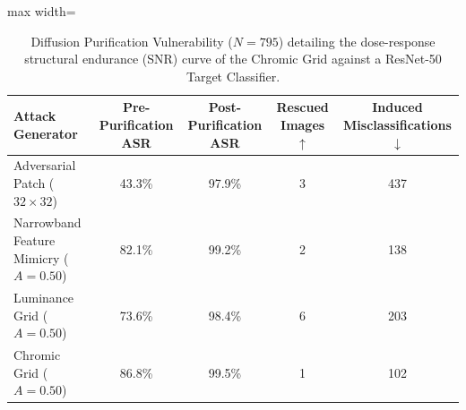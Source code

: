 \begin{table}[htbp]
\centering
\small
\caption{Diffusion Purification Vulnerability ($N=795$) detailing the dose-response structural endurance (SNR) curve of the Chromic Grid against a ResNet-50 Target Classifier.}
\label{tab:diffusion_purification}
\begin{adjustbox}{max width=\linewidth}
\begin{tabular}{@{}lcccc@{}}
\toprule
\textbf{Attack Generator} & \textbf{Pre-Purification ASR} & \textbf{Post-Purification ASR} & \textbf{Rescued Images $\uparrow$} & \textbf{Induced Misclassifications $\downarrow$} \\ \midrule
Adversarial Patch ($32\times32$) & 43.3\% & 97.9\% & 3 & 437 \\
Narrowband Feature Mimicry ($A=0.50$) & 82.1\% & 99.2\% & 2 & 138 \\
Luminance Grid ($A=0.50$) & 73.6\% & 98.4\% & 6 & 203 \\
Chromic Grid ($A=0.50$) & 86.8\% & 99.5\% & 1 & 102 \\
\bottomrule
\end{tabular}
\end{adjustbox}
\end{table}
